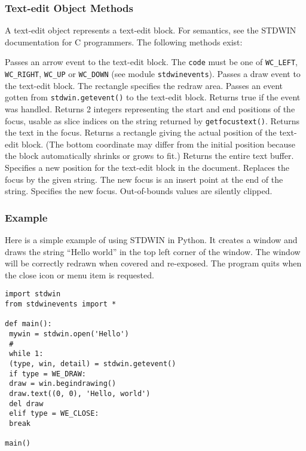 \subsubsection{Text-edit Object Methods}

A text-edit object represents a text-edit block.
For semantics, see the STDWIN documentation for C programmers.
The following methods exist:
\begin{description}
Passes an arrow event to the text-edit block.
The
{\tt code}
must be one of
{\tt WC\_LEFT},
{\tt WC\_RIGHT},
{\tt WC\_UP}
or
{\tt WC\_DOWN}
(see module
{\tt stdwinevents}).
Passes a draw event to the text-edit block.
The rectangle specifies the redraw area.
Passes an event gotten from
{\tt stdwin.getevent()}
to the text-edit block.
Returns true if the event was handled.
Returns 2 integers representing the start and end positions of the
focus, usable as slice indices on the string returned by
{\tt getfocustext()}.
Returns the text in the focus.
Returns a rectangle giving the actual position of the text-edit block.
(The bottom coordinate may differ from the initial position because
the block automatically shrinks or grows to fit.)
Returns the entire text buffer.
Specifies a new position for the text-edit block in the document.
Replaces the focus by the given string.
The new focus is an insert point at the end of the string.
Specifies the new focus.
Out-of-bounds values are silently clipped.
\end{description}

\subsubsection{Example}

Here is a simple example of using STDWIN in Python.
It creates a window and draws the string ``Hello world'' in the top
left corner of the window.
The window will be correctly redrawn when covered and re-exposed.
The program quits when the close icon or menu item is requested.
\bcode\begin{verbatim}
import stdwin
from stdwinevents import *

def main():
 mywin = stdwin.open('Hello')
 #
 while 1:
 (type, win, detail) = stdwin.getevent()
 if type = WE_DRAW:
 draw = win.begindrawing()
 draw.text((0, 0), 'Hello, world')
 del draw
 elif type = WE_CLOSE:
 break

main()
\end{verbatim}\ecode

